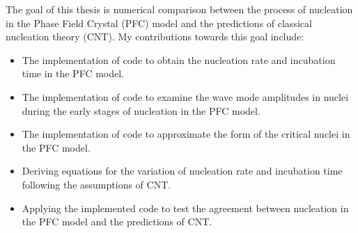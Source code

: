 The goal of this thesis is numerical comparison between the process of nucleation in the Phase Field Crystal (PFC) model and the predictions of classical nucleation theory (CNT). My contributions towards this goal include:
\begin{itemize}
\item The implementation of code to obtain the nucleation rate and incubation time in the PFC model.
\item The implementation of code to examine the wave mode amplitudes in nuclei during the early stages of nucleation in the PFC model.
\item The implementation of code to approximate the form of the critical nuclei in the PFC model.
\item Deriving equations for the variation of nucleation rate and incubation time following the assumptions of CNT.
\item Applying the implemented code to test the agreement between nucleation in the PFC model and the predictions of CNT.
\end{itemize}












